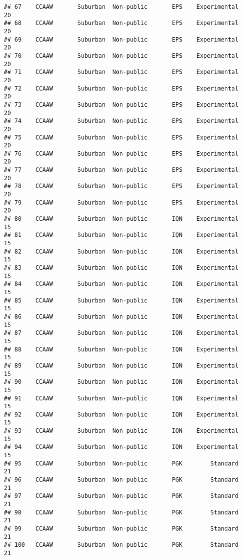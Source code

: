 \documentclass[
]{article}
\begin{document}
\begin{verbatim}
## 67    CCAAW       Suburban  Non-public       EPS    Experimental        20
## 68    CCAAW       Suburban  Non-public       EPS    Experimental        20
## 69    CCAAW       Suburban  Non-public       EPS    Experimental        20
## 70    CCAAW       Suburban  Non-public       EPS    Experimental        20
## 71    CCAAW       Suburban  Non-public       EPS    Experimental        20
## 72    CCAAW       Suburban  Non-public       EPS    Experimental        20
## 73    CCAAW       Suburban  Non-public       EPS    Experimental        20
## 74    CCAAW       Suburban  Non-public       EPS    Experimental        20
## 75    CCAAW       Suburban  Non-public       EPS    Experimental        20
## 76    CCAAW       Suburban  Non-public       EPS    Experimental        20
## 77    CCAAW       Suburban  Non-public       EPS    Experimental        20
## 78    CCAAW       Suburban  Non-public       EPS    Experimental        20
## 79    CCAAW       Suburban  Non-public       EPS    Experimental        20
## 80    CCAAW       Suburban  Non-public       IQN    Experimental        15
## 81    CCAAW       Suburban  Non-public       IQN    Experimental        15
## 82    CCAAW       Suburban  Non-public       IQN    Experimental        15
## 83    CCAAW       Suburban  Non-public       IQN    Experimental        15
## 84    CCAAW       Suburban  Non-public       IQN    Experimental        15
## 85    CCAAW       Suburban  Non-public       IQN    Experimental        15
## 86    CCAAW       Suburban  Non-public       IQN    Experimental        15
## 87    CCAAW       Suburban  Non-public       IQN    Experimental        15
## 88    CCAAW       Suburban  Non-public       IQN    Experimental        15
## 89    CCAAW       Suburban  Non-public       IQN    Experimental        15
## 90    CCAAW       Suburban  Non-public       IQN    Experimental        15
## 91    CCAAW       Suburban  Non-public       IQN    Experimental        15
## 92    CCAAW       Suburban  Non-public       IQN    Experimental        15
## 93    CCAAW       Suburban  Non-public       IQN    Experimental        15
## 94    CCAAW       Suburban  Non-public       IQN    Experimental        15
## 95    CCAAW       Suburban  Non-public       PGK        Standard        21
## 96    CCAAW       Suburban  Non-public       PGK        Standard        21
## 97    CCAAW       Suburban  Non-public       PGK        Standard        21
## 98    CCAAW       Suburban  Non-public       PGK        Standard        21
## 99    CCAAW       Suburban  Non-public       PGK        Standard        21
## 100   CCAAW       Suburban  Non-public       PGK        Standard        21

\end{verbatim}
\end{document}
